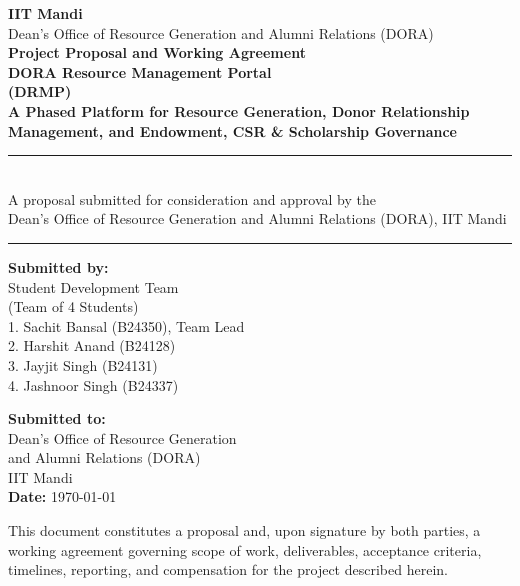 \documentclass[11pt]{article}
\begin{document}
\begin{titlepage}
\thispagestyle{empty}
\begin{center}
\vspace*{1.0cm}
{\large\bfseries IIT Mandi}\\[4pt]
{\normalsize Dean's Office of Resource Generation and Alumni Relations (DORA)}\\[1.8cm]
{\Large\bfseries Project Proposal and Working Agreement}\\[10pt]
{\huge\bfseries DORA Resource Management Portal}\\[6pt]
{\Large\bfseries (DRMP)}\\[10pt]
{\large\bfseries A Phased Platform for Resource Generation, Donor Relationship\\ Management, and Endowment, CSR \& Scholarship Governance}\\[1.2cm]
\rule{0.85\textwidth}{0.4pt}\\[10pt]
{\normalsize A proposal submitted for consideration and approval by the\\ Dean's Office of Resource Generation and Alumni Relations (DORA), IIT Mandi}\\[10pt]
\rule{0.85\textwidth}{0.4pt}
\vspace{1.2cm}

\begin{minipage}[t]{0.48\textwidth}
\textbf{Submitted by:}\\[4pt]
Student Development Team\\
(Team of 4 Students)\\[6pt]
1. Sachit Bansal (B24350), Team Lead\\[4pt]
2. Harshit Anand (B24128)\\[4pt]
3. Jayjit Singh (B24131)\\[4pt]
4. Jashnoor Singh (B24337)
\end{minipage}
\hfill
\begin{minipage}[t]{0.48\textwidth}
\textbf{Submitted to:}\\[4pt]
Dean's Office of Resource Generation\\
and Alumni Relations (DORA)\\
{}IIT Mandi\\[6pt]
\textbf{Date:} \today
\end{minipage}

\vfill
{\small This document constitutes a proposal and, upon signature by both parties, a working agreement governing scope of work, deliverables, acceptance criteria, timelines, reporting, and compensation for the project described herein.}
\end{center}
\end{titlepage}
\end{document}
